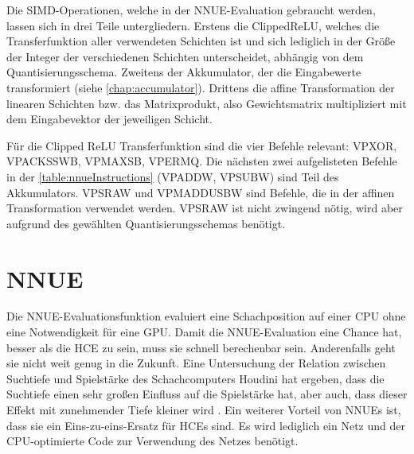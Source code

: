 Die \ac{SIMD}-Operationen, welche in der \ac{NNUE}-Evaluation gebraucht werden, lassen sich in drei Teile untergliedern. Erstens die Clipped\ac{ReLU}, welches die Transferfunktion aller verwendeten Schichten ist und sich lediglich in der Größe der Integer der verschiedenen Schichten unterscheidet, abhängig von dem Quantisierungsschema. Zweitens der Akkumulator, der die Eingabewerte transformiert (siehe \autoref{chap:accumulator}). Drittens die affine Transformation der linearen Schichten bzw. das Matrixprodukt, also Gewichtsmatrix multipliziert mit dem Eingabevektor der jeweiligen Schicht.

Für die Clipped \ac{ReLU} Transferfunktion sind die vier Befehle relevant: VPXOR, VPACKSSWB, VPMAXSB, VPERMQ. Die nächsten zwei aufgelisteten Befehle in der \autoref{table:nnueInstructions} (VPADDW, VPSUBW) sind Teil des Akkumulators. VPSRAW und VPMADDUSBW sind Befehle, die in der affinen Transformation verwendet werden. VPSRAW ist nicht zwingend nötig, wird aber aufgrund des gewählten Quantisierungsschemas benötigt.



\section{NNUE}

Die \ac{NNUE}-Evaluationsfunktion evaluiert eine Schachposition auf einer CPU ohne eine Notwendigkeit für eine GPU. Damit die \ac{NNUE}-Evaluation eine Chance hat, besser als die \ac{HCE} zu sein, muss sie schnell berechenbar sein. Anderenfalls geht sie nicht weit genug in die Zukunft. Eine Untersuchung der Relation zwischen Suchtiefe und Spielstärke des Schachcomputers Houdini \citeyear{Ferreira2013} hat ergeben, dass die Suchtiefe einen sehr großen Einfluss auf die Spielstärke hat, aber auch, dass dieser Effekt mit zunehmender Tiefe kleiner wird \cite{Ferreira2013}. Ein weiterer Vorteil von \acp{NNUE} ist, dass sie ein Eins-zu-eins-Ersatz für \acp{HCE} sind. Es wird lediglich ein Netz und der CPU-optimierte Code zur Verwendung des Netzes benötigt.


